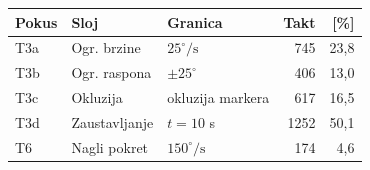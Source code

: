 \begin{tabular}{l l l rr}
\hline
\textbf{Pokus} & \textbf{Sloj} & \textbf{Granica} & \small Takt & \small [\%] \\
\hline
T3a & Ogr. brzine & $25^\circ/\text{s}$ & 745 & 23,8 \\
T3b & Ogr. raspona & $\pm 25^\circ$ & 406 & 13,0 \\
T3c & Okluzija & okluzija markera & 617 & 16,5 \\
T3d & Zaustavljanje & $t=10$ s & 1252 & 50,1 \\
T6 & Nagli pokret & $150^\circ/\text{s}$ & 174 & 4,6 \\
\hline
\end{tabular}
